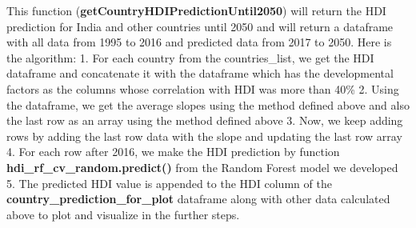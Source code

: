 \documentclass[11pt]{article}
\begin{document}
    

    This function (\textbf{getCountryHDIPredictionUntil2050}) will return
the HDI prediction for India and other countries until 2050 and will
return a dataframe with all data from 1995 to 2016 and predicted data
from 2017 to 2050. Here is the algorithm: 1. For each country from the
countries\_list, we get the HDI dataframe and concatenate it with the
dataframe which has the developmental factors as the columns whose
correlation with HDI was more than 40\% 2. Using the dataframe, we get
the average slopes using the method defined above and also the last row
as an array using the method defined above 3. Now, we keep adding rows
by adding the last row data with the slope and updating the last row
array 4. For each row after 2016, we make the HDI prediction by function
\textbf{hdi\_rf\_cv\_random.predict()} from the Random Forest model we
developed 5. The predicted HDI value is appended to the HDI column of
the \textbf{country\_prediction\_for\_plot} dataframe along with other
data calculated above to plot and visualize in the further steps.
\end{document}
